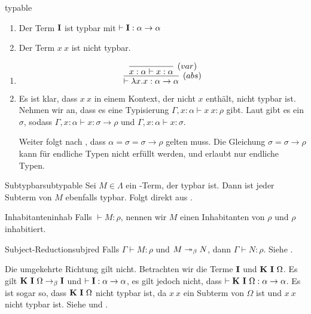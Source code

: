 \begin{example}{}{typable}
    \begin{enumerate}
        \item Der Term $\textbf{I}$ ist typbar mit $\vdash\textbf{I}:\alpha\to\alpha$
        \item Der Term $x~x$ ist nicht typbar. 
    \end{enumerate}
\Proof
\begin{enumerate}
      \item \[
    \infer[(abs)]{\vdash \lambda x.x:\alpha\to\alpha}{\infer[(var)]{x:\alpha\vdash x : \alpha}{}}
    \]
    \item Es ist klar, dass $x~x$ in einem Kontext, der nicht $x$ enthält, nicht typbar ist. Nehmen wir an, dass es eine Typisierung $\Gamma,x:\alpha\vdash x~x:\rho$ gibt. Laut  gibt es ein $\sigma$, sodass $\Gamma, x:\alpha\vdash x:\sigma\to\rho$ und $\Gamma, x:\alpha\vdash x:\sigma$.
    
    Weiter folgt nach , dass $\alpha=\sigma=\sigma\to\rho$ gelten muss. Die Gleichung $\sigma = \sigma\to\rho$ kann für endliche Typen nicht erfüllt werden, und  erlaubt nur endliche Typen.	    
    \end{enumerate}
\end{example}

\begin{lemma}{Subtypbar}{subtypable}
    Sei $M\in\Lambda$ ein \tlambda-Term, der typbar ist. Dann ist jeder Subterm von $M$ ebenfalls typbar.
    \Proof
    Folgt direkt aus .
\end{lemma}

\begin{definition}{Inhabitanten}{inhab}
    Falls $\vdash M:\rho$, nennen wir $M$ einen Inhabitanten von $\rho$ und $\rho$ inhabitiert.
\end{definition}

\begin{lemma}{Subject-Reduction}{subjred}
    Falls $\Gamma\vdash M:\rho$ und $M \twoheadrightarrow_\beta N$, dann $\Gamma\vdash N:\rho$.
    \Proof
    Siehe \cite{lecturesCH}.    
\end{lemma}
\begin{remark}
    Die umgekehrte Richtung gilt nicht. Betrachten wir die Terme $\textbf{I}$ und $\textbf{K}~\textbf{I}~\Omega$. Es gilt $\textbf{K}~\textbf{I}~\Omega\rightarrow_\beta\textbf{I}$ und $\vdash \textbf{I}:\alpha\to\alpha$, es gilt jedoch nicht, dass $\vdash\textbf{K}~\textbf{I}~\Omega:\alpha\to\alpha$. Es ist sogar so, dass $\textbf{K}~\textbf{I}~\Omega$ nicht typbar ist, da $x~x$ ein Subterm von $\Omega$ ist und $x~x$ nicht typbar ist. Siehe  und .
\end{remark}

